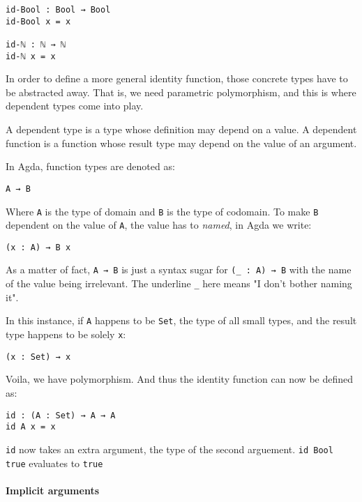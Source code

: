 \documentclass[12pt, a4paper]{article}
\begin{document}
\begin{lstlisting}
id-Bool : Bool → Bool
id-Bool x = x

id-ℕ : ℕ → ℕ
id-ℕ x = x
\end{lstlisting}

In order to define a more general identity function, those concrete types have
to be abstracted away. That is, we need parametric polymorphism, and this is
where dependent types come into play.

A dependent type is a type whose definition may depend on a value. A dependent
function is a function whose result type may depend on the value of an argument.

In Agda, function types are denoted as:

\begin{lstlisting}
A → B
\end{lstlisting}

Where {\lstinline|A|} is the type of domain and {\lstinline|B|} is the type of
codomain. To make {\lstinline|B|} dependent on the value of {\lstinline|A|}, the
value has to \textit{named}, in Agda we write:

\begin{lstlisting}
(x : A) → B x
\end{lstlisting}

As a matter of fact, {\lstinline|A → B|} is just a syntax sugar for {\lstinline|(_ : A) → B|}
with the name of the value being irrelevant. The underline {\lstinline|_|} here
means "I don't bother naming it".

In this instance, if {\lstinline|A|} happens to be {\lstinline|Set|}, the type
of all small types, and the result type happens to be solely {\lstinline|x|}:

\begin{lstlisting}
(x : Set) → x
\end{lstlisting}

Voila, we have polymorphism. And thus the identity function can now be defined as:

\begin{lstlisting}
id : (A : Set) → A → A
id A x = x
\end{lstlisting}

{\lstinline|id|} now takes an extra argument, the type of the second arguement.
{\lstinline|id Bool true|} evaluates to {\lstinline|true|}

\paragraph{Implicit arguments}
\end{document}
